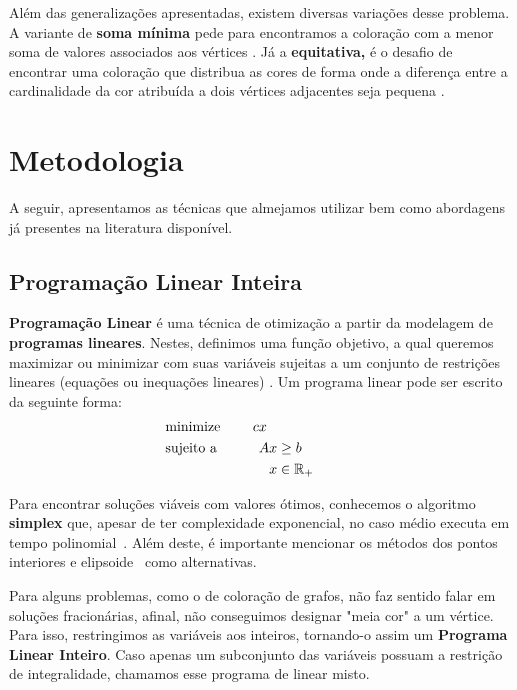 \documentclass[11pt]{article}
\begin{document}
Além das generalizações apresentadas, existem diversas variações desse problema.
A variante de \textbf{soma mínima} pede para encontramos a coloração com a menor soma de valores associados aos vértices \autocite{Jin2016Algorithmsminimumsum}.
Já a \textbf{equitativa,} é o desafio de encontrar uma coloração que distribua as cores de forma onde a diferença entre a cardinalidade da cor atribuída a dois vértices adjacentes seja pequena \autocite{Meyer1973EquitableColoring}.

\section{Metodologia}
\label{sec:orgf04de2b}
\label{metodologia}
A seguir, apresentamos as técnicas que almejamos utilizar bem como abordagens já presentes na literatura disponível.

\subsection{Programação Linear Inteira}
\label{sec:orgc6a4f4a}
\textbf{Programação Linear} é uma técnica de otimização a partir da modelagem de \textbf{programas lineares}.
Nestes, definimos uma função objetivo, a qual queremos maximizar ou minimizar com suas variáveis sujeitas a um conjunto de restrições lineares (equações ou inequações lineares) \autocite{Chvatal1983LinearProgramming}. Um programa linear pode ser escrito da seguinte forma:
\begin{alignat*}{4}
& \omit\rlap{minimize \quad \quad $\displaystyle cx$} \\
& \mbox{sujeito a}&& \quad & Ax & \geq b  & \quad &  \\
&                 &&       & x               & \in \mathbb{R}_+ &      &
\end{alignat*}

Para encontrar soluções viáveis com valores ótimos, conhecemos o algoritmo \textbf{simplex} que, apesar de ter complexidade exponencial, no caso médio executa em tempo polinomial~\autocite{Borgwardt1986SimplexMethodAlgorithms}.
Além deste, é importante mencionar os métodos dos pontos interiores \autocite{Karmarkar1984newpolynomialtime} e elipsoide~\autocite{Bland1981FeatureArticleTheEllipsoid} como alternativas.

Para alguns problemas, como o de coloração de grafos, não faz sentido falar em soluções fracionárias, afinal, não conseguimos designar "meia cor" a um vértice.
Para isso, restringimos as variáveis aos inteiros, tornando-o assim um \textbf{Programa Linear Inteiro}. Caso apenas um subconjunto das variáveis possuam a restrição de integralidade, chamamos esse programa de linear misto.
\end{document}
